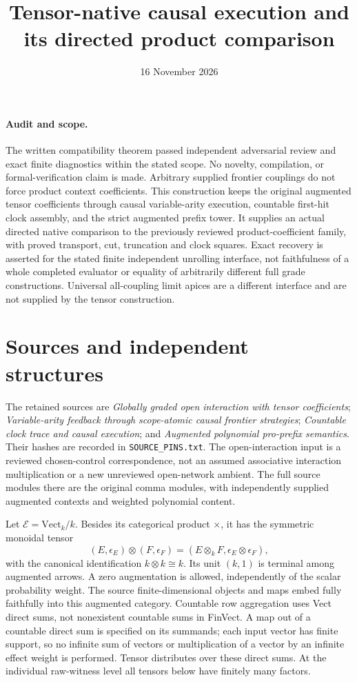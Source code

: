 \documentclass[11pt]{article}
\title{Tensor-native causal execution and its directed product comparison}
\date{16 November 2026}
\newcommand{\E}{\mathcal E}
\begin{document}
\maketitle
\paragraph{Audit and scope.} The written compatibility theorem passed independent adversarial review and exact finite diagnostics within the stated scope. No novelty, compilation, or formal-verification claim is made. Arbitrary supplied frontier couplings do not force product context coefficients. This construction keeps the original augmented tensor coefficients through causal variable-arity execution, countable first-hit clock assembly, and the strict augmented prefix tower. It supplies an actual directed native comparison to the previously reviewed product-coefficient family, with proved transport, cut, truncation and clock squares. Exact recovery is asserted for the stated finite independent unrolling interface, not faithfulness of a whole completed evaluator or equality of arbitrarily different full grade constructions. Universal all-coupling limit apices are a different interface and are not supplied by the tensor construction.

\section{Sources and independent structures}
The retained sources are \emph{Globally graded open interaction with tensor coefficients}; \emph{Variable-arity feedback through scope-atomic causal frontier strategies}; \emph{Countable clock trace and causal execution}; and \emph{Augmented polynomial pro-prefix semantics}. Their hashes are recorded in \texttt{SOURCE\_PINS.txt}. The open-interaction input is a reviewed chosen-control correspondence, not an assumed associative interaction multiplication or a new unreviewed open-network ambient. The full source modules there are the original comma modules, with independently supplied augmented contexts and weighted polynomial content.

Let $\E=\mathrm{Vect}_k/k$. Besides its categorical product $\times$, it has the symmetric monoidal tensor
\[
 (E,\epsilon_E)\otimes(F,\epsilon_F)
 =(E\otimes_k F,\epsilon_E\otimes\epsilon_F),
\]
with the canonical identification $k\otimes k\cong k$. Its unit $(k,1)$ is terminal among augmented arrows. A zero augmentation is allowed, independently of the scalar probability weight. The source finite-dimensional objects and maps embed fully faithfully into this augmented category. Countable row aggregation uses Vect direct sums, not nonexistent countable sums in FinVect. A map out of a countable direct sum is specified on its summands; each input vector has finite support, so no infinite sum of vectors or multiplication of a vector by an infinite effect weight is performed. Tensor distributes over these direct sums. At the individual raw-witness level all tensors below have finitely many factors.
\end{document}
